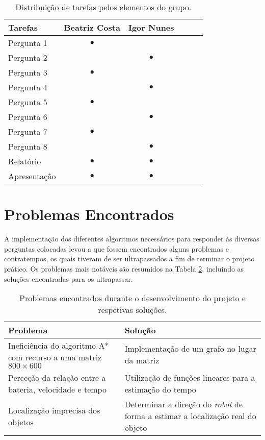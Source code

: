 \begin{table}[!htbp]
	\centering
	\begin{tabular}{l c c c c c}
		\toprule
		\textbf{Tarefas} & \textbf{Beatriz Costa} & \textbf{Igor Nunes}\\
		\midrule
		Pergunta 1      &   $\bullet$   &               \\
        Pergunta 2      &               &   $\bullet$   \\
        Pergunta 3      &   $\bullet$   &               \\
        Pergunta 4      &               &   $\bullet$   \\
        Pergunta 5      &   $\bullet$   &               \\
        Pergunta 6      &               &   $\bullet$   \\
        Pergunta 7      &   $\bullet$   &               \\
        Pergunta 8      &               &   $\bullet$   \\
        Relatório       &   $\bullet$   &   $\bullet$   \\
        Apresentação    &   $\bullet$   &   $\bullet$   \\
		\bottomrule
	\end{tabular}
	\caption[Distribuição de tarefas]{Distribuição de tarefas pelos elementos do grupo.}
	\label{tab::divisao-trabalho}
\end{table}

\section{Problemas Encontrados}
\label{sec::reflexao:problemas}

A implementação dos diferentes algoritmos necessários para responder às diversas perguntas colocadas levou a que fossem encontrados alguns problemas e contratempos, os quais tiveram de ser ultrapassados a fim de terminar o projeto prático. Os problemas mais notáveis são resumidos na Tabela \ref{tab::problemas}, incluindo as soluções encontradas para os ultrapassar.

\begin{table}[!htbp]
	\centering
	\begin{tabular}{p{} p{}}
		\toprule
		{\bfseries Problema} & {\bfseries Solução} \\
		\midrule
		\midrule
		Ineficiência do algoritmo A* com recurso a uma matriz $800 \times 600$ & Implementação de um grafo no lugar da matriz\\
		\midrule
		Perceção da relação entre a bateria, velocidade e tempo & Utilização de funções lineares para a estimação do tempo\\
		\midrule
		Localização imprecisa dos objetos & Determinar a direção do \emph{robot} de forma a estimar a localização real do objeto \\
		\bottomrule
	\end{tabular}
	\caption[Problemas encontrados e respetivas soluções]{Problemas encontrados durante o desenvolvimento do projeto e respetivas soluções.}
	\label{tab::problemas}
\end{table}


